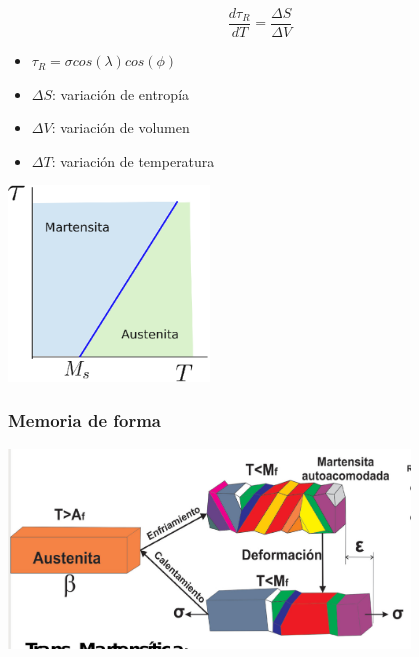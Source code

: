 \documentclass[usenames,dvipsnames]{beamer}
\begin{document}
\begin{frame}
\begin{multicols}{2}
 
\begin{equation*}
 \frac{d \tau_{R}}{dT}=\frac{\Delta S}{\Delta V} 
\end{equation*}
\begin{itemize}
 \item  $\tau_{R}= \sigma cos(\lambda)cos(\phi)$
 \item $\Delta S$: variación de entropía
 \item $\Delta V$: variación de volumen
 \item $\Delta T$: variación de temperatura
\end{itemize}

\includegraphics[width=0.4\textwidth]{img/intro/Clapeyron.eps}
\end{multicols}
\end{frame}


\frametitle{Memoria de forma}

\begin{frame}
 \includegraphics[width=0.8\textwidth]{img/intro/memoria.jpg}
\end{frame}


\end{document}
